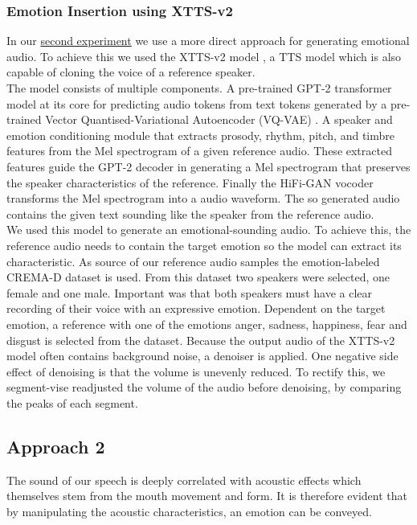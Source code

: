 \documentclass[11pt]{article}
\begin{document}
\subsubsection{Emotion Insertion using XTTS-v2}
In our \hyperref[Experiment 2]{second experiment} we use a more direct approach for generating emotional audio. To achieve this we used the XTTS-v2 model \cite{casanova2024xtts}, a TTS model which is also capable of cloning the voice of a reference speaker. \\
The model consists of multiple components. A pre-trained GPT-2 transformer model \cite{radford2019language} at its core for predicting audio tokens from text tokens generated by a pre-trained Vector Quantised-Variational Autoencoder (VQ-VAE) \cite{betker2023better, NIPS2017_7a98af17}. A speaker and emotion conditioning module that extracts prosody, rhythm, pitch, and timbre features from the Mel spectrogram of a given reference audio. These extracted features guide the GPT-2 decoder in generating a Mel spectrogram that preserves the speaker characteristics of the reference. Finally the HiFi-GAN \cite{kong2020hifi} vocoder transforms the Mel spectrogram into a audio waveform. The so generated audio contains the given text sounding like the speaker from the reference audio. \\ 
We used this model to generate an emotional-sounding audio. To achieve this, the reference audio needs to contain the target emotion so the model can extract its characteristic. As source of our reference audio samples the emotion-labeled CREMA-D \cite{cao_data} dataset is used. From this dataset two speakers were selected, one female and one male. Important was that both speakers must have a clear recording of their voice with an expressive emotion. Dependent on the target emotion, a reference with one of the emotions anger, sadness, happiness, fear and disgust is selected from the dataset. Because the output audio of the XTTS-v2 model often contains background noise, a denoiser is applied. One negative side effect of denoising is that the volume is unevenly reduced. To rectify this, we segment-vise readjusted the volume of the audio before denoising, by comparing the peaks of each segment.

\subsection{Approach 2}

The sound of our speech is deeply correlated with acoustic effects which themselves stem from the mouth movement and form\cite{arias_beyond_2020}. It is therefore evident that by manipulating the acoustic characteristics, an emotion can be conveyed.
\end{document}
